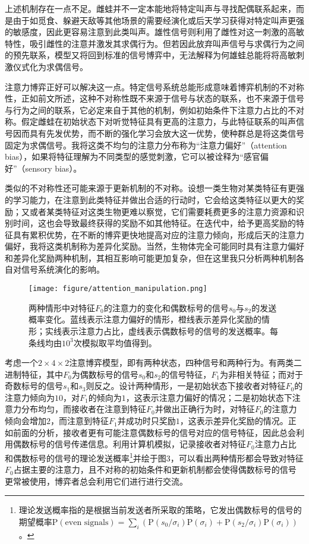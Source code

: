 \documentclass[12pt]{ctexart}  %
\begin{document}
上述机制存在一点不足。雌蛙并不一定本能地将特定叫声与寻找配偶联系起来，而是由于如觅食、躲避天敌等其他场景的需要经演化或后天学习获得对特定叫声更强的敏感度，因此更容易注意到此类叫声。雄性信号则利用了雌性对这一刺激的高敏特性，吸引雌性的注意并激发其求偶行为。但若因此放弃叫声信号与求偶行为之间的预先联系，模型又将回到标准的信号博弈中，无法解释为何雄蛙总能将将高敏刺激仪式化为求偶信号。

注意力博弈正好可以解决这一点。特定信号系统总能形成意味着博弈机制的不对称性，正如前文所述，这种不对称性既不来源于信号与状态的联系，也不来源于信号与行为之间的联系，它必定来自于其他的机制，例如初始条件下注意力占比的不对称。假定雌蛙在初始状态下对听觉特征具有更高的注意力，与此特征联系的叫声信号因而具有先发优势，而不断的强化学习会放大这一优势，使种群总是将这类信号固定为求偶信号。我将这类不均匀的注意力分布称为“注意力偏好”（attention bias），如果将特征理解为不同类型的感觉刺激，它可以被诠释为“感官偏好”（sensory bias）。

类似的不对称性还可能来源于更新机制的不对称。设想一类生物对某类特征有更强的学习能力，在注意到此类特征并做出合适的行动时，它会给这类特征以更大的奖励；又或者某类特征对这类生物更难以察觉，它们需要耗费更多的注意力资源和识别时间，这也会导致最终获得的奖励不如其他特征。在迭代中，给予更高奖励的特征具有累积优势，在不断的博弈更快地提高对应的注意力倾向，形成后天的注意力偏好，我将这类机制称为差异化奖励。当然，生物体完全可能同时具有注意力偏好和差异化奖励两种机制，其相互影响可能更加复杂，但在这里我只分析两种机制各自对信号系统演化的影响。

\begin{figure}[htbp]
    \centering
    \texttt{[image: figure/attention\_manipulation.png]}
    \caption{两种情形中对特征$F_0$的注意力的变化和偶数标号的信号$s_0$与$s_2$的发送概率变化。蓝线表示注意力偏好的情形，橙线表示差异化奖励的情形；实线表示注意力占比，虚线表示偶数标号的信号的发送概率。每条线均由$10^3$次模拟取平均值得到。}
\end{figure}

考虑一个$2\times 4\times 2$注意博弈模型，即有两种状态，四种信号和两种行为。有两类二进制特征，其中$F_0$为偶数标号的信号$s_0$和$s_2$的信号特征，$F_1$为非相关特征；而对于奇数标号的信号$s_1$和$s_3$则反之。设计两种情形，一是初始状态下接收者对特征$F_0$的注意力倾向为$10$，对$F_1$的倾向为$1$，这表示注意力偏好的情况；二是初始状态下注意力分布均匀，而接收者在注意到特征$F_0$并做出正确行为时，对特征$F_0$的注意力倾向会增加$2$，而注意到特征$F_1$并成功时只奖励$1$，这表示差异化奖励的情况。正如前面的分析，接收者更有可能注意偶数标号的信号对应的信号特征，因此总会利用偶数标号的信号传递信息。利用计算机模拟，记录接收者对特征$F_0$注意力占比和偶数标号的信号的理论发送概率\footnote{理论发送概率指的是根据当前发送者所采取的策略，它发出偶数标号的信号的期望概率$\text{P}(\text{even signals})=\sum_i(\text{P}(s_0/\sigma_i)\text{P}(\sigma_i)+\text{P} (s_2/\sigma_i)\text{P}(\sigma_i))$。}并绘于图3，可以看出两种情形都会导致对特征$F_0$占据主要的注意力，且不对称的初始条件和更新机制都会使得偶数标号的信号更常被使用，博弈者总会利用它们进行进行交流。
\end{document}
